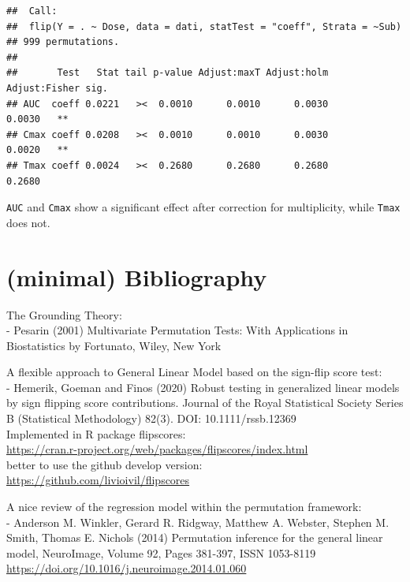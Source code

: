 \documentclass[
]{article}
\begin{document}
\begin{verbatim}
##  Call:
##  flip(Y = . ~ Dose, data = dati, statTest = "coeff", Strata = ~Sub) 
## 999 permutations.
## 
##       Test   Stat tail p-value Adjust:maxT Adjust:holm Adjust:Fisher sig.
## AUC  coeff 0.0221   ><  0.0010      0.0010      0.0030        0.0030   **
## Cmax coeff 0.0208   ><  0.0010      0.0010      0.0030        0.0020   **
## Tmax coeff 0.0024   ><  0.2680      0.2680      0.2680        0.2680
\end{verbatim}

\texttt{AUC} and \texttt{Cmax} show a significant effect after
correction for multiplicity, while \texttt{Tmax} does not.

\hypertarget{minimal-bibliography}{%
\section{(minimal) Bibliography}\label{minimal-bibliography}}

The Grounding Theory:\\
- Pesarin (2001) Multivariate Permutation Tests: With Applications in
Biostatistics by Fortunato, Wiley, New York

A flexible approach to General Linear Model based on the sign-flip score
test:\\
- Hemerik, Goeman and Finos (2020) Robust testing in generalized linear
models by sign flipping score contributions. Journal of the Royal
Statistical Society Series B (Statistical Methodology) 82(3). DOI:
10.1111/rssb.12369\\
Implemented in R package flipscores:\\
\url{https://cran.r-project.org/web/packages/flipscores/index.html}~\\
better to use the github develop version:\\
\url{https://github.com/livioivil/flipscores}

A nice review of the regression model within the permutation
framework:\\
- Anderson M. Winkler, Gerard R. Ridgway, Matthew A. Webster, Stephen M.
Smith, Thomas E. Nichols (2014) Permutation inference for the general
linear model, NeuroImage, Volume 92, Pages 381-397, ISSN 1053-8119
\url{https://doi.org/10.1016/j.neuroimage.2014.01.060}
\end{document}
